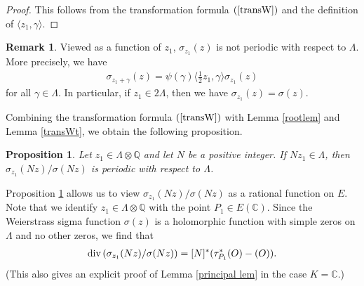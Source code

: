 \documentclass[11pt]{amsart}
\newtheorem{prop}[thm]{Proposition}
\theoremstyle{definition}
\newtheorem{rmk}[thm]{Remark}
\begin{document}
\begin{proof}
This follows from the transformation formula $(\ref{transW})$ and the definition of $\langle z_1, \gamma \rangle$.
\end{proof}

\begin{rmk}
Viewed as a function of $z_1$, $\sigma_{z_1}(z)$ is not periodic with respect to $\Lambda$.
More precisely, we have 
%
\begin{align}\label{transWt'}
\sigma_{z_1+\gamma}(z)=\psi(\gamma) \langle \frac{1}{2}z_1, \gamma \rangle \sigma_{z_1}(z)
\end{align}
%
for all $\gamma \in \Lambda$. In particular, if $z_1 \in 2\Lambda$, then we have $\sigma_{z_1}(z)=\sigma(z)$.
\end{rmk}

Combining the transformation formula $(\ref{transW})$ with Lemma \ref{rootlem} and Lemma \ref{transWt}, we obtain the following proposition.

\begin{prop}\label{ell func lem}
Let $z_1 \in \Lambda \otimes \mathbb{Q}$ and let $N$ be a positive integer. If $Nz_1 \in \Lambda$, then $\sigma_{z_1}(Nz)/\sigma(Nz)$ is periodic with respect to $\Lambda$.
\end{prop}


Proposition \ref{ell func lem} allows us to view $\sigma_{z_1}(Nz)/\sigma(Nz)$ as a rational function on $E$. Note that we identify $z_1 \in \Lambda \otimes \mathbb{Q}$ with the point $P_1 \in E(\mathbb{C})$. Since the Weierstrass sigma function $\sigma(z)$ is a holomorphic function with simple zeros on $\Lambda$ and no other zeros, we find that
%
\begin{align*}
{\rm div}\left(\sigma_{z_1}(Nz)/\sigma(Nz)\right)=[N]^{\ast}(\tau_{P_1}^{\ast} (O)-(O)).
\end{align*}
%
(This also gives an explicit proof of Lemma \ref{principal lem} in the case $K=\mathbb{C}$.)
\end{document}
